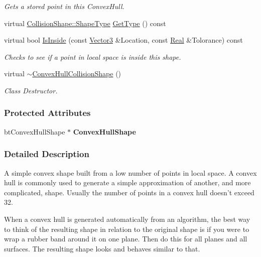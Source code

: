 \begin{DoxyCompactItemize}
\begin{DoxyCompactList}\small\item\em Gets a stored point in this ConvexHull. \item\end{DoxyCompactList}\item 
virtual \hyperlink{classphys_1_1CollisionShape_af3ba4fd8af5b9557f912d2f5ff35a588}{CollisionShape::ShapeType} \hyperlink{classphys_1_1ConvexHullCollisionShape_abba00848b751665f1c1b817ec7f5d8df}{GetType} () const 
\item 
virtual bool \hyperlink{classphys_1_1ConvexHullCollisionShape_a3c801a1deb1710b73d3f83380f33187e}{IsInside} (const \hyperlink{classphys_1_1Vector3}{Vector3} \&Location, const \hyperlink{namespacephys_af7eb897198d265b8e868f45240230d5f}{Real} \&Tolorance) const 
\begin{DoxyCompactList}\small\item\em Checks to see if a point in local space is inside this shape. \item\end{DoxyCompactList}\item 
\hypertarget{classphys_1_1ConvexHullCollisionShape_a8977e6ec5c013bedd83c00f76e607820}{
virtual \hyperlink{classphys_1_1ConvexHullCollisionShape_a8977e6ec5c013bedd83c00f76e607820}{$\sim$ConvexHullCollisionShape} ()}
\label{classphys_1_1ConvexHullCollisionShape_a8977e6ec5c013bedd83c00f76e607820}

\begin{DoxyCompactList}\small\item\em Class Destructor. \item\end{DoxyCompactList}\end{DoxyCompactItemize}
\subsubsection*{Protected Attributes}
\begin{DoxyCompactItemize}
\item 
\hypertarget{classphys_1_1ConvexHullCollisionShape_a9ff411d77b4ba341f3bb130b3af6c0dc}{
btConvexHullShape $\ast$ {\bfseries ConvexHullShape}}
\label{classphys_1_1ConvexHullCollisionShape_a9ff411d77b4ba341f3bb130b3af6c0dc}

\end{DoxyCompactItemize}


\subsubsection{Detailed Description}
A simple convex shape built from a low number of points in local space. A convex hull is commonly used to generate a simple approximation of another, and more complicated, shape. Usually the number of points in a convex hull doesn't exceed 32. \par
 \par
 When a convex hull is generated automatically from an algorithm, the best way to think of the resulting shape in relation to the original shape is if you were to wrap a rubber band around it on one plane. Then do this for all planes and all surfaces. The resulting shape looks and behaves similar to that. 

